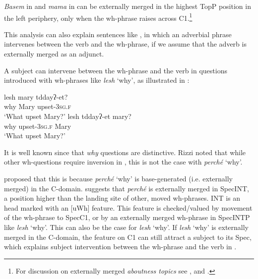 \documentclass[output=paper]{LSP/langsci}
\begin{document}
\textit{Basem} in  and \textit{mama} in  can be externally merged in the highest TopP position in the left periphery, only when the wh-phrase raises across C1.\footnote{For discussion on externally merged \textit{aboutness topics} see \citet{Reinhart1981,Lambrecht1994}, and  \citet{FrascarelliHinterhölzl2007}.}

This analysis can also explain sentences like , in which an adverbial phrase intervenes between the verb and the wh-phrase, if we assume that the adverb is externally merged as an adjunct.

A subject can intervene between the wh-phrase and the verb in questions introduced with wh-phrases like \textit{lesh} ‘why’, as illustrated in :


\ea%
\label{ex:sulaiman:11}
\ea \label{ex:sulaiman:11a}
\gll lesh       mary              tddayʔ-et?\\
why          Mary       upset-3\textsc{sg.f}    \\
\glt ‘What upset Mary?’
\ex
\gll lesh              tddayʔ-et                                      mary?\\
 why         upset-3\textsc{sg.f}      Mary\\
\glt ‘What upset Mary?’
\z
\z

It is well known since \citet{Rizzi1991} that \textit{why} questions are distinctive. Rizzi noted that while other wh-questions require inversion in , this is not the case with \textit{perché} ‘why’.

\ea%
\label{ex:sulaiman:12}

  \citep[273]{Rizzi2001}


\z
\z

\citet{Rizzi1991} proposed that this is because \textit{perché} ‘why’ is base-generated (i.e. externally merged) in the C-domain. \citet{Rizzi2001} suggests that \textit{perché} is externally merged in SpecINT, a position higher than the landing site of other, moved wh-phrases. INT is an  head marked with an [uWh] feature. This feature is checked/valued by movement of the wh-phrase to SpecC1, or by an externally merged wh-phrase in SpecINTP like \textit{lesh} ‘why’. This can also be the case for \textit{lesh} ‘why’. If \textit{lesh} ‘why’ is externally merged in the C-domain, the  feature on C1 can still attract a subject to its Spec, which explains subject intervention between the wh-phrase and the verb in .
\end{document}
